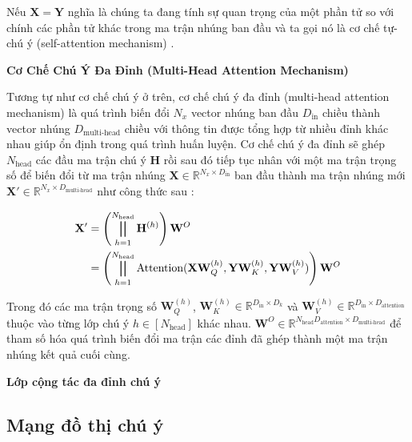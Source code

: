 Nếu $\mathbf{X} = \mathbf{Y}$ nghĩa là chúng ta đang tính sự quan trọng của một phần tử so với chính các phần tử khác trong ma trận nhúng ban đầu và ta gọi nó là cơ chế tự-chú ý (self-attention mechanism) .

\textbf{Cơ Chế Chú Ý Đa Đỉnh (Multi-Head Attention Mechanism)}

Tương tự như cơ chế chú ý ở trên, cơ chế chú ý đa đỉnh (multi-head attention mechanism) là quá trình biến đổi $N_x$ vector nhúng ban đầu $D_{\text{in}}$ chiều thành vector nhúng $D_{\text{multi-head}}$ chiều với thông tin được tổng hợp từ nhiều đỉnh khác nhau giúp ổn định trong quá trình huấn luyện. Cơ chế chú ý đa đỉnh sẽ ghép $N_{\text{head}}$ các đầu ma trận chú ý $\mathbf{H}$ rồi sau đó tiếp tục nhân với một ma trận trọng số để biến đổi từ ma trận nhúng $\mathbf{X} \in \mathbb{R}^{N_x \times D_\text{in}}$ ban đầu thành ma trận nhúng mới $\mathbf{X}' \in \mathbb{R}^{N_x \times D_{\text{multi-head}}}$ như công thức sau :

\begin{equation}
\label{headAttention}
\begin{split}
\mathbf{X}'& =\left(\bigparallel_{h=1}^{N_{\text{head}}}\mathbf{H}^{(h)}\right)\mathbf{W}^{O} \\
& = \left(\bigparallel_{h=1}^{N_{\text{head}}} \text{Attention}(\mathbf{X} \mathbf{W}_Q^{(h)}, \mathbf{Y} \mathbf{W}_K^{(h)}, \mathbf{Y} \mathbf{W}_V^{(h)}) \right)\mathbf{W}^{O}
\end{split}
\end{equation}

Trong đó các ma trận trọng số $\mathbf{W}_Q^{(h)}$, $\mathbf{W}_K^{(h)} \in \mathbb{R}^{D_{\text{in}} \times D_{k}}$ và $\mathbf{W}_V^{(h)} \in \mathbb{R}^{D_{\text{in}} \times D_{\text{attention}}}$ thuộc vào từng lớp chú ý $h \in [N_{\text{head}}]$ khác nhau. $\mathbf{W}^{O} \in \mathbb{R}^{N_{\text{head}} D_{\text{attention}} \times D_{\text{multi-head}}}$ để tham số hóa quá trình biến đổi ma trận các đỉnh đã ghép thành một ma trận nhúng kết quả cuối cùng.

\textbf{Lớp cộng tác đa đỉnh chú ý}

\cite{weng2018attention}

\subsection{Mạng đồ thị chú ý}
\label{sec:GAT}

